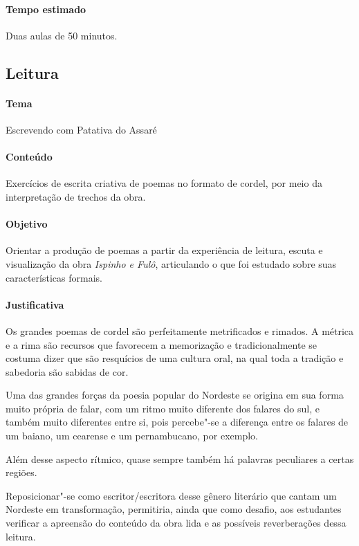\documentclass[12pt]{extarticle}
\begin{document}
\paragraph{Tempo estimado} Duas aulas de 50 minutos. 

\subsection{Leitura}

\paragraph{Tema} Escrevendo com Patativa do Assaré

\paragraph{Conteúdo} Exercícios de escrita criativa de poemas no formato de cordel, 
por meio da interpretação de trechos da obra.

\paragraph{Objetivo} Orientar a produção de poemas a partir da experiência
de leitura, escuta e visualização da obra \emph{Ispinho e Fulô}, articulando o que foi estudado sobre 
suas características formais.

\paragraph{Justificativa} Os grandes poemas de cordel são perfeitamente 
metrificados e rimados. A métrica e a rima são recursos que
favorecem a memorização e tradicionalmente se costuma
dizer que são resquícios de uma cultura oral, na qual toda a
tradição e sabedoria são sabidas de cor.

Uma das grandes forças da poesia popular do Nordeste
se origina em sua forma muito própria de falar, com um
ritmo muito diferente dos falares do sul, e também muito
diferentes entre si, pois percebe"-se a diferença entre os
falares de um baiano, um cearense e um pernambucano,
por exemplo.

Além desse aspecto rítmico, quase sempre também há
palavras peculiares a certas regiões.

Reposicionar"-se como escritor/escritora desse gênero literário que cantam um Nordeste em transformação, 
permitiria, ainda que como desafio, aos estudantes 
verificar a apreensão do conteúdo da obra lida e as possíveis reverberações dessa leitura.
\end{document}
